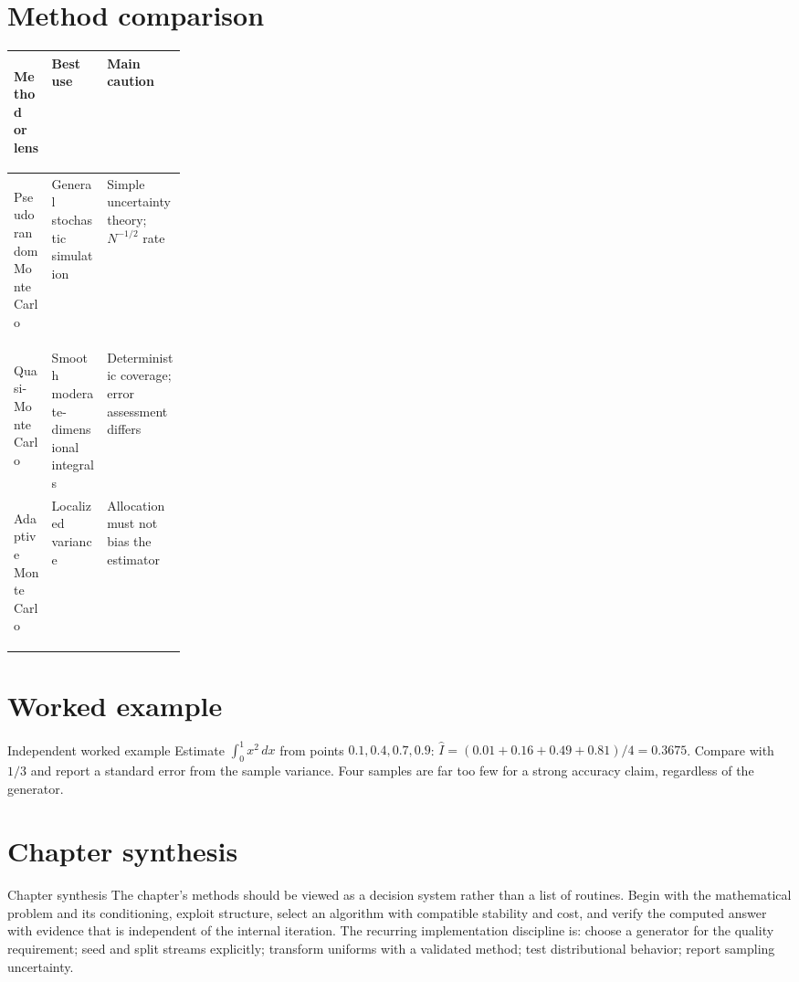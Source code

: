 \documentclass[10pt,letterpaper]{article}
\begin{document}
\section*{Method comparison}
\begin{center}
\small
\begin{tabularx}{\linewidth}{>{\bfseries\raggedright\arraybackslash}p{0.22\linewidth}XX}
\toprule
Method or lens & Best use & Main caution \\
\midrule
Pseudorandom Monte Carlo & General stochastic simulation & Simple uncertainty theory; $N^{-1/2}$ rate \\
Quasi-Monte Carlo & Smooth moderate-dimensional integrals & Deterministic coverage; error assessment differs \\
Adaptive Monte Carlo & Localized variance & Allocation must not bias the estimator \\
\bottomrule
\end{tabularx}
\end{center}

\section*{Worked example}
\begin{exambox}{Independent worked example}
Estimate $\int_0^1 x^2\,dx$ from points $0.1,0.4,0.7,0.9$: $\widehat I=(0.01+0.16+0.49+0.81)/4=0.3675$.  Compare with $1/3$ and report a standard error from the sample variance.  Four samples are far too few for a strong accuracy claim, regardless of the generator.
\end{exambox}

\section*{Chapter synthesis}
\begin{summarybox}{Chapter synthesis}
The chapter's methods should be viewed as a decision system rather than a list of routines.  Begin with the mathematical problem and its conditioning, exploit structure, select an algorithm with compatible stability and cost, and verify the computed answer with evidence that is independent of the internal iteration.  The recurring implementation discipline is: choose a generator for the quality requirement; seed and split streams explicitly; transform uniforms with a validated method; test distributional behavior; report sampling uncertainty.
\end{summarybox}
\end{document}
